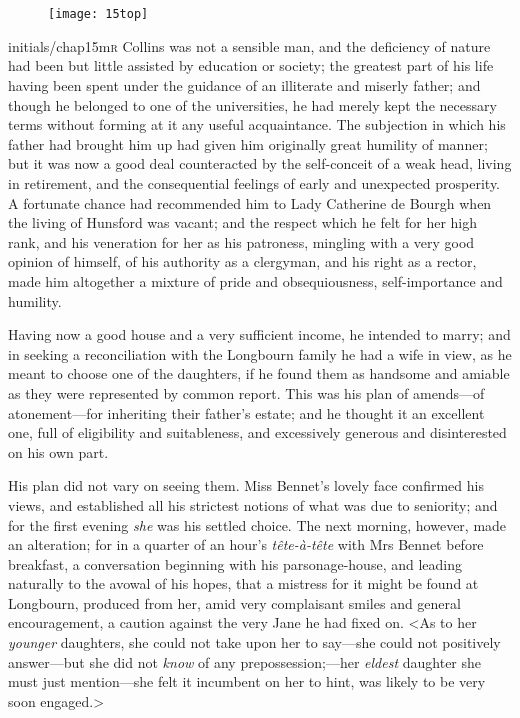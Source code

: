 \chapter[Chapter \thechapter]{}
\begin{figure}[t!]
\centering
\texttt{[image: 15top]}
\end{figure}

\lettrine[lines=6,image=true]{initials/chap15m}{r}  Collins was not a sensible man, and the deficiency of nature had been but little assisted by education or society; the greatest part of his life having been spent under the guidance of an illiterate and miserly father; and though he belonged to one of the universities, he had merely kept the necessary terms without forming at it any useful acquaintance. The subjection in which his father had brought him up had given him originally great humility of manner; but it was now a good deal counteracted by the self-conceit of a weak head, living in retirement, and the consequential feelings of early and unexpected prosperity. A fortunate chance had recommended him to Lady Catherine de Bourgh when the living of Hunsford was vacant; and the respect which he felt for her high rank, and his veneration for her as his patroness, mingling with a very good opinion of himself, of his authority as a clergyman, and his right as a rector, made him altogether a mixture of pride and obsequiousness, self-importance and humility.

Having now a good house and a very sufficient income, he intended to marry; and in seeking a reconciliation with the Longbourn family he had a wife in view, as he meant to choose one of the daughters, if he found them as handsome and amiable as they were represented by common report. This was his plan of amends—of atonement—for inheriting their father's estate; and he thought it an excellent one, full of eligibility and suitableness, and excessively generous and disinterested on his own part.

His plan did not vary on seeing them. Miss Bennet's lovely face confirmed his views, and established all his strictest notions of what was due to seniority; and for the first evening \textit{she} was his settled choice. The next morning, however, made an alteration; for in a quarter of an hour's \textit{tête-à-tête} with Mrs Bennet before breakfast, a conversation beginning with his parsonage-house, and leading naturally to the avowal of his hopes, that a mistress for it might be found at Longbourn, produced from her, amid very complaisant smiles and general encouragement, a caution against the very Jane he had fixed on. <As to her \textit{younger} daughters, she could not take upon her to say—she could not positively answer—but she did not \textit{know} of any prepossession;—her \textit{eldest} daughter she must just mention—she felt it incumbent on her to hint, was likely to be very soon engaged.>

